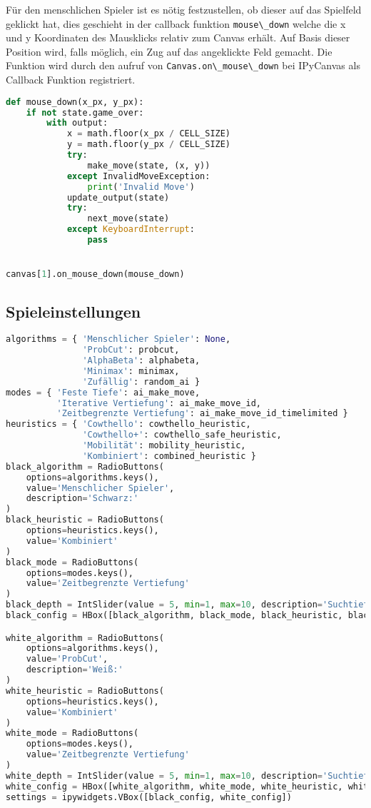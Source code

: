 Für den menschlichen Spieler ist es nötig festzustellen, ob dieser auf
das Spielfeld geklickt hat, dies geschieht in der callback funktion
\passthrough{\lstinline!mouse\_down!} welche die x und y Koordinaten des
Mausklicks relativ zum Canvas erhält. Auf Basis dieser Position wird,
falls möglich, ein Zug auf das angeklickte Feld gemacht. Die Funktion
wird durch den aufruf von
\passthrough{\lstinline!Canvas.on\_mouse\_down!} bei IPyCanvas als
Callback Funktion registriert.

\begin{lstlisting}[language=Python]
def mouse_down(x_px, y_px):
    if not state.game_over:
        with output:
            x = math.floor(x_px / CELL_SIZE)
            y = math.floor(y_px / CELL_SIZE)
            try:
                make_move(state, (x, y))
            except InvalidMoveException:
                print('Invalid Move')
            update_output(state)
            try:
                next_move(state)
            except KeyboardInterrupt:
                pass


canvas[1].on_mouse_down(mouse_down)
\end{lstlisting}

\hypertarget{spieleinstellungen}{%
\subsection{Spieleinstellungen}\label{spieleinstellungen}}

\begin{lstlisting}[language=Python]
algorithms = { 'Menschlicher Spieler': None,
               'ProbCut': probcut,
               'AlphaBeta': alphabeta,
               'Minimax': minimax,
               'Zufällig': random_ai }
modes = { 'Feste Tiefe': ai_make_move,
          'Iterative Vertiefung': ai_make_move_id,
          'Zeitbegrenzte Vertiefung': ai_make_move_id_timelimited }
heuristics = { 'Cowthello': cowthello_heuristic,
               'Cowthello+': cowthello_safe_heuristic,
               'Mobilität': mobility_heuristic,
               'Kombiniert': combined_heuristic }
black_algorithm = RadioButtons(
    options=algorithms.keys(),
    value='Menschlicher Spieler',
    description='Schwarz:'
)
black_heuristic = RadioButtons(
    options=heuristics.keys(),
    value='Kombiniert'
)
black_mode = RadioButtons(
    options=modes.keys(),
    value='Zeitbegrenzte Vertiefung'
)
black_depth = IntSlider(value = 5, min=1, max=10, description='Suchtiefe:')
black_config = HBox([black_algorithm, black_mode, black_heuristic, black_depth])

white_algorithm = RadioButtons(
    options=algorithms.keys(),
    value='ProbCut',
    description='Weiß:'
)
white_heuristic = RadioButtons(
    options=heuristics.keys(),
    value='Kombiniert'
)
white_mode = RadioButtons(
    options=modes.keys(),
    value='Zeitbegrenzte Vertiefung'
)
white_depth = IntSlider(value = 5, min=1, max=10, description='Suchtiefe:')
white_config = HBox([white_algorithm, white_mode, white_heuristic, white_depth])
settings = ipywidgets.VBox([black_config, white_config])
\end{lstlisting}

